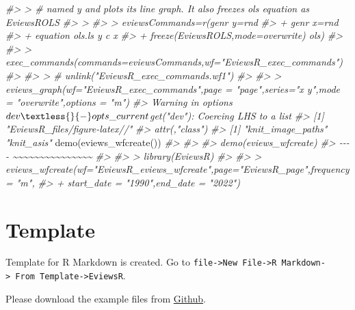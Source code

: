 \documentclass[
]{article}
\newenvironment{Shaded}{\begin{snugshade}}{\end{snugshade}}
\newcommand{\CommentTok}[1]{\textcolor[rgb]{0.56,0.35,0.01}{\textit{#1}}}
\newcommand{\FunctionTok}[1]{\textcolor[rgb]{0.00,0.00,0.00}{#1}}
\newcommand{\NormalTok}[1]{#1}
\begin{document}
\begin{Shaded}
\begin{Highlighting}[]
\CommentTok{\#\textgreater{} \textgreater{} \# named \textasciigrave{}y\textasciigrave{} and plots its line graph. It also freezes \textasciigrave{}ols\textasciigrave{} equation as \textasciigrave{}EviewsROLS\textasciigrave{}}
\CommentTok{\#\textgreater{} \textgreater{} }
\CommentTok{\#\textgreater{} \textgreater{} eviewsCommands=r\textquotesingle{}(genr y=rnd}
\CommentTok{\#\textgreater{} + genr x=rnd}
\CommentTok{\#\textgreater{} + equation ols.ls y c x}
\CommentTok{\#\textgreater{} + freeze(EviewsROLS,mode=overwrite) ols)\textquotesingle{}}
\CommentTok{\#\textgreater{} }
\CommentTok{\#\textgreater{} \textgreater{} exec\_commands(commands=eviewsCommands,wf="EviewsR\_exec\_commands")}
\CommentTok{\#\textgreater{} }
\CommentTok{\#\textgreater{} \textgreater{} \# unlink("EviewsR\_exec\_commands.wf1")}
\CommentTok{\#\textgreater{} }
\CommentTok{\#\textgreater{} \textgreater{} eviews\_graph(wf="EviewsR\_exec\_commands",page = "page",series="x y",mode = "overwrite",options = "m")}
\CommentTok{\#\textgreater{} Warning in options$dev \textless{}{-} opts\_current$get("dev"): Coercing LHS to a list}
\CommentTok{\#\textgreater{} [1] "EviewsR\_files/figure{-}latex//"}
\CommentTok{\#\textgreater{} attr(,"class")}
\CommentTok{\#\textgreater{} [1] "knit\_image\_paths" "knit\_asis"}
\FunctionTok{demo}\NormalTok{(}\FunctionTok{eviews\_wfcreate}\NormalTok{())}
\CommentTok{\#\textgreater{} }
\CommentTok{\#\textgreater{} }
\CommentTok{\#\textgreater{}  demo(eviews\_wfcreate)}
\CommentTok{\#\textgreater{}  {-}{-}{-}{-} \textasciitilde{}\textasciitilde{}\textasciitilde{}\textasciitilde{}\textasciitilde{}\textasciitilde{}\textasciitilde{}\textasciitilde{}\textasciitilde{}\textasciitilde{}\textasciitilde{}\textasciitilde{}\textasciitilde{}\textasciitilde{}\textasciitilde{}}
\CommentTok{\#\textgreater{} }
\CommentTok{\#\textgreater{} \textgreater{} library(EviewsR)}
\CommentTok{\#\textgreater{} }
\CommentTok{\#\textgreater{} \textgreater{} eviews\_wfcreate(wf="EviewsR\_eviews\_wfcreate",page="EviewsR\_page",frequency = "m",}
\CommentTok{\#\textgreater{} +                 start\_date = "1990",end\_date = "2022")}
\end{Highlighting}
\end{Shaded}

\hypertarget{template}{%
\section{Template}\label{template}}

Template for R Markdown is created. Go to \texttt{file-\textgreater{}New\ File-\textgreater{}R\ Markdown-\textgreater{}\ From\ Template-\textgreater{}EviewsR}.

Please download the example files from \href{https://github.com/sagirumati/EviewsR/tree/master/inst/examples/}{Github}.
\end{document}
